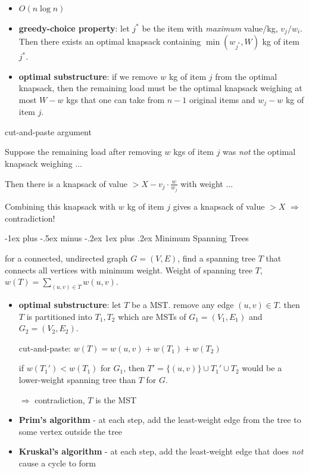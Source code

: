 \documentclass[10pt, landscape]{article}
\makeatletter
\renewcommand{\subsubsection}{\@startsection{subsubsection}{3}{0mm}%
  {-1ex plus -.5ex minus -.2ex}%
  {1ex plus .2ex}%
{\normalfont\small\bfseries}}%
\makeatother
\begin{document}
\begin{multicols*}{4}
  \begin{itemize}
    \item $O(n \log n)$
    \item \textbf{greedy-choice property}: let $j^*$ be the item with \textit{maximum} value/kg, $v_j/w_i$. Then there exists an optimal knapsack containing $\min(w_{j^*}, W)$ kg of item $j^*$.
    \item \textbf{optimal substructure}: if we remove $w$ kg of item $j$ from the optimal knapsack, then the remaining load must be the optimal knapsack weighing at most $W-w$ kgs that one can take from $n-1$ original items and $w_j - w$ kg of item $j$.
  \end{itemize}

  \begin{niceproof}
    cut-and-paste argument

    Suppose the remaining load after removing $w$ kgs of item $j$ was \textit{not} the optimal knapsack weighing ...

    Then there is a knapsack of value $> X-v_j \cdot \frac{w}{w_j}$ with weight ...

    Combining this knapsack with $w$ kg of item $j$ gives a knapsack of value $>X$ $\Rightarrow$ contradiction!
  \end{niceproof}

  \subsubsection{Minimum Spanning Trees}

  for a connected, undirected graph $G = (V, E)$, find a spanning tree $T$ that connects all vertices with minimum weight. Weight of spanning tree $T$, $w(T) = \sum\limits_{(u, v) \in T} w(u, v)$.

  \begin{itemize}
    \item \textbf{optimal substructure}: let $T$ be a MST. remove any edge $(u, v) \in T$. then $T$ is partitioned into $T_1, T_2$ which are MSTs of  $G_1 = (V_1, E_1)$ and $G_2 = (V_2, E_2)$.
      \begin{niceproof}
        cut-and-paste: $w(T) = w(u, v) + w(T_1) + w(T_2)$

        if $w(T_1') < w(T_1)$ for $G_1$, then $T' = \{(u, v)\} \cup T_1' \cup T_2$ would be a lower-weight spanning tree than $T$ for $G$. 

        $\Rightarrow$ contradiction, $T$ is the MST
      \end{niceproof}
    \item \textbf{Prim's algorithm} - at each step, add the least-weight edge from the tree to some vertex outside the tree
    \item \textbf{Kruskal's algorithm} - at each step, add the least-weight edge that does \textit{not} cause a cycle to form
  \end{itemize}


\end{multicols*}
\end{document}
